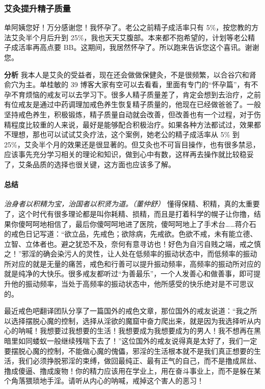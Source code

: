 \subsubsection{艾灸提升精子质量}

\begin{case}[不孕不育]
    单阿姨您好！万分感谢您！我怀孕了。老公之前精子成活率只有 5\%，按您教的方法艾灸半个月后升到 25\%，我也天天艾腹部。本来都不抱希望的，计划等老公精子成活率再高点要 BB。这期间，我居然怀孕了。所以跑来告诉您这个喜讯。谢谢您。

    \textbf{分析} 我本人是艾灸的受益者，现在还会做做保健灸，不是很频繁，以合谷穴和肾俞穴为主。单桂敏的 39 博客大家有空可以去看看，里面有专门的“怀孕篇”，有不孕不育烦恼的戒友可以去学习下。很多人精子质量差了，肯定会想到去治疗，之前有位戒友是通过中药调理加戒色养生恢复精子质量的，他现在已经做爸爸了。一般坚持戒色养生，积极锻炼，精子质量自动就会改善，但改善也有一个过程，对于伤精程度比较重的人来说，最好是能够配合积极治疗。如果各种方法都试过，效果都不理想，那也可以试试艾灸疗法，这个案例，她老公的精子成活率从 5\% 到 25\%，艾灸半个月的效果还是很显著的。但艾灸也不可盲目操作，也有很多禁忌，应该事先充分学习相关的理论和知识，做到心中有数，这样再去操作就比较稳妥了，艾条品质的选择也很关键，这方面也应该多了解。
\end{case}

\paragraph*{总结}

\textit{治身者以积精为宝，治国者以积贤为道。（董仲舒）} 懂得保精、积精，真的太重要了，这个时代有很多理论都是叫你耗精、损精，而且是打着科学的幌子让你撸，结果你傻呵呵地相信了，最后你傻呵呵地进了医院，傻呵呵地上了手术台……蒋介石的戒色日记写道：“欲立品，先戒色；欲除病，先戒欲。色欲不戒，未有能立德、立智、立体者也。避之犹恐不及，奈何有意寻访也！好色为自污自贱之端，戒之慎之！”邪淫的确会染污人的灵性，让人处在低频率的振动状态中，而低频率的振动所对应的就是无量的痛苦，戒色和行善可以提升振动频率，高频率的振动所对应的就是纯净的大快乐。很多戒友都听过“为善最乐”，一个人发善心和做善事，即可提升他的振动频率，当处于高频率的振动状态中，他所感受的快乐绝对是不可思议的。

最近戒色吧翻译团队分享了一篇国外的戒色文章，那位国外的戒友说道：“我之所以选择摆脱心魔的控制，选择从淫欲的魔窟中奋力爬出来，就是因为我选择听从内心的呐喊！我想要过我想要的生活！我想要成为我想要成为的男人！我不想再在黑暗里如同蝼蚁一般继续残喘下去了！”这位国外的戒友说得真是太好了，我们一定要摆脱心魔的控制，不能做心魔的傀儡，邪淫的生活根本就不是我们真正想要的生活，我们必须挣脱邪淫的束缚，做回最纯正、最有正气的自己，而不是撸成屌丝、撸成傻逼、撸成废物！你的精力应该用在学业上，用在奋斗事业上，而不是躲在某个角落猥琐地手淫。请听从内心的呐喊，戒掉这个害人的恶习！

